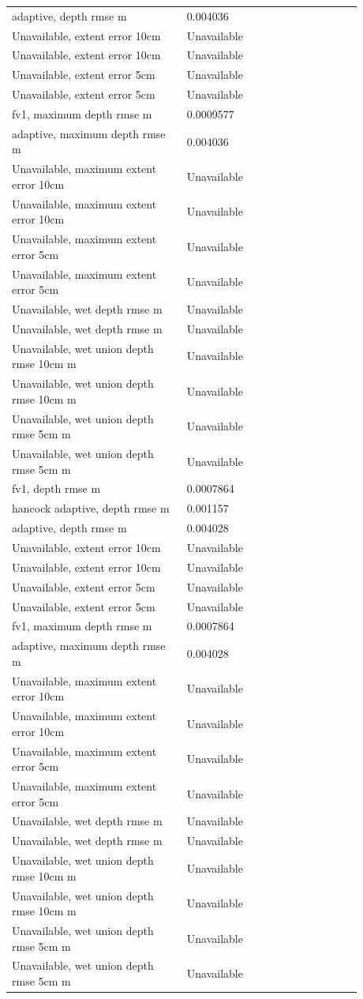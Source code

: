 \begin{longtable}{p{0.4400\linewidth}p{0.4400\linewidth}}
adaptive, depth rmse m & 0.004036 \\
Unavailable, extent error 10cm & Unavailable \\
Unavailable, extent error 10cm & Unavailable \\
Unavailable, extent error 5cm & Unavailable \\
Unavailable, extent error 5cm & Unavailable \\
fv1, maximum depth rmse m & 0.0009577 \\
adaptive, maximum depth rmse m & 0.004036 \\
Unavailable, maximum extent error 10cm & Unavailable \\
Unavailable, maximum extent error 10cm & Unavailable \\
Unavailable, maximum extent error 5cm & Unavailable \\
Unavailable, maximum extent error 5cm & Unavailable \\
Unavailable, wet depth rmse m & Unavailable \\
Unavailable, wet depth rmse m & Unavailable \\
Unavailable, wet union depth rmse 10cm m & Unavailable \\
Unavailable, wet union depth rmse 10cm m & Unavailable \\
Unavailable, wet union depth rmse 5cm m & Unavailable \\
Unavailable, wet union depth rmse 5cm m & Unavailable \\
fv1, depth rmse m & 0.0007864 \\
hancock adaptive, depth rmse m & 0.001157 \\
adaptive, depth rmse m & 0.004028 \\
Unavailable, extent error 10cm & Unavailable \\
Unavailable, extent error 10cm & Unavailable \\
Unavailable, extent error 5cm & Unavailable \\
Unavailable, extent error 5cm & Unavailable \\
fv1, maximum depth rmse m & 0.0007864 \\
adaptive, maximum depth rmse m & 0.004028 \\
Unavailable, maximum extent error 10cm & Unavailable \\
Unavailable, maximum extent error 10cm & Unavailable \\
Unavailable, maximum extent error 5cm & Unavailable \\
Unavailable, maximum extent error 5cm & Unavailable \\
Unavailable, wet depth rmse m & Unavailable \\
Unavailable, wet depth rmse m & Unavailable \\
Unavailable, wet union depth rmse 10cm m & Unavailable \\
Unavailable, wet union depth rmse 10cm m & Unavailable \\
Unavailable, wet union depth rmse 5cm m & Unavailable \\
Unavailable, wet union depth rmse 5cm m & Unavailable \\
\end{longtable}
\endgroup

